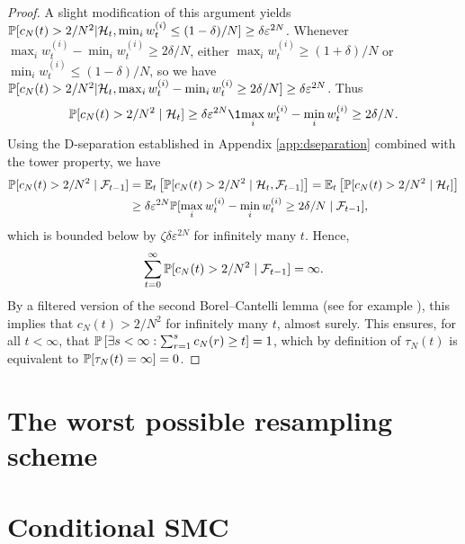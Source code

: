 \begin{proof}
A slight modification of this argument yields $\mathbb{P}[ c_N(t) > 2/N^2 | \mathcal{H}_t, \min_i w_t^{(i)} \leq (1-\delta)/N ] \geq \delta \varepsilon^{2N} $.
Whenever $\max_i w_t^{(i)} - \min_i w_t^{(i)} \geq 2\delta/N$, either $\max_i w_t^{(i)} \geq (1+\delta)/N$ or $\min_i w_t^{(i)} \leq (1-\delta)/N$, so we have 
$\mathbb{P}[ c_N(t) > 2/N^2 | \mathcal{H}_t, \max_i w_t^{(i)} - \min_i w_t^{(i)} \geq 2\delta/N ] \geq \delta \varepsilon^{2N}$.
Thus 
\begin{equation*}
\Prob[ c_N(t)>2/N^2 \mid \mathcal{H}_t ] \geq \delta \varepsilon^{2N}\1{\max_i w_t^{(i)} - \min_i w_t^{(i)} \geq 2\delta/N} .
\end{equation*}
Using the D-separation established in Appendix \ref{app:dseparation} combined with the tower property, we have
\begin{align*}
\mathbb{P}[ c_N(t)>2/N^2 \mid \mathcal{F}_{t-1} ]
&=\mathbb{E}_t\left[ \mathbb{P}[ c_N(t)>2/N^2 \mid \mathcal{H}_t, \mathcal{F}_{t-1} ] \right]
=\mathbb{E}_t\left[ \mathbb{P}[ c_N(t)>2/N^2 \mid \mathcal{H}_t ] \right] \\
&\geq \delta \varepsilon^{2N} \mathbb{P}[ \max_i w_t^{(i)} - \min_i w_t^{(i)} \geq 2\delta/N \mid \mathcal{F}_{t-1} ] ,
\end{align*}
which is bounded below by $ \zeta \delta \varepsilon^{2N} $ for infinitely many $t$. 
Hence,
\begin{equation*}
\sum_{t=0}^\infty \mathbb{P}[ c_N(t) > 2/N^2 \mid \mathcal{F}_{t-1} ] = \infty .
\end{equation*}
By a filtered version of the second Borel--Cantelli lemma (see for example \cite[Theorem 4.3.4]{durrett2019}), this implies that $c_N(t) >2/N^2$ for infinitely many $t$, almost surely.
This ensures, for all $t <\infty$, that $\mathbb{P}\left[ \exists s<\infty : \sum_{r=1}^s c_N(r) \geq t \right] =1$, which by definition of $\tau_N(t)$ is equivalent to $\mathbb{P}[ \tau_N(t) = \infty ] =0$.
\end{proof}


\section{The worst possible resampling scheme}


\section{Conditional SMC}


